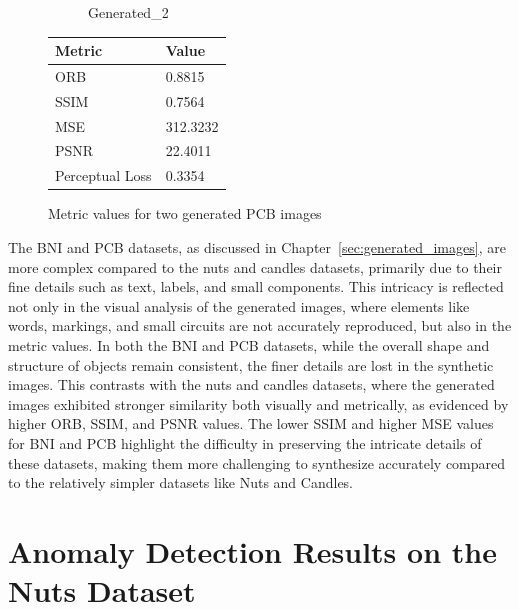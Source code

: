 \documentclass[12pt,DIV14,BCOR12mm,a4paper,footinclude=false,headinclude,parskip=half-,twoside,openright,cleardoublepage=empty,toc=index,bibliography=totoc,listof=totoc]{scrreprt}
\numberwithin{equation}{chapter}
\begin{document}
\begin{figure}
\begin{minipage}[H]{\linewidth}
\begin{minipage}[H]{0.5\linewidth}
\begin{subfigure}[t]{0.48\linewidth}
                \caption{Generated\_2}
            \end{subfigure}
        \end{minipage}%
        \hfill
        \begin{minipage}[H]{0.5\linewidth} %
            \centering
            \small
            \begin{tabular}{p{3cm} p{2cm}}
                \toprule
                \textbf{Metric} & \textbf{Value} \\
                \midrule
                ORB             & 0.8815        \\
                SSIM            & 0.7564        \\
                MSE             & 312.3232      \\
                PSNR            & 22.4011       \\
                Perceptual Loss & 0.3354        \\
                \bottomrule
            \end{tabular}
        \end{minipage}%
        \caption{Metric values for two generated PCB images}
        \label{fig:comparison_generated_1_1_generated_1_2_pcb}
    \end{minipage}
\end{figure}


The BNI and PCB datasets, as discussed in Chapter~\ref{sec:generated_images}, are more complex compared to the nuts and candles datasets, primarily due to their fine details such as text, labels, and small components. This intricacy is reflected not only in the visual analysis of the generated images, where elements like words, markings, and small circuits are not accurately reproduced, but also in the metric values. In both the BNI and PCB datasets, while the overall shape and structure of objects remain consistent, the finer details are lost in the synthetic images. This contrasts with the nuts and candles datasets, where the generated images exhibited stronger similarity both visually and metrically, as evidenced by higher ORB, SSIM, and PSNR values. The lower SSIM and higher MSE values for BNI and PCB highlight the difficulty in preserving the intricate details of these datasets, making them more challenging to synthesize accurately compared to the relatively simpler datasets like Nuts and Candles.

\section{Anomaly Detection Results on the Nuts Dataset}
\end{document}
